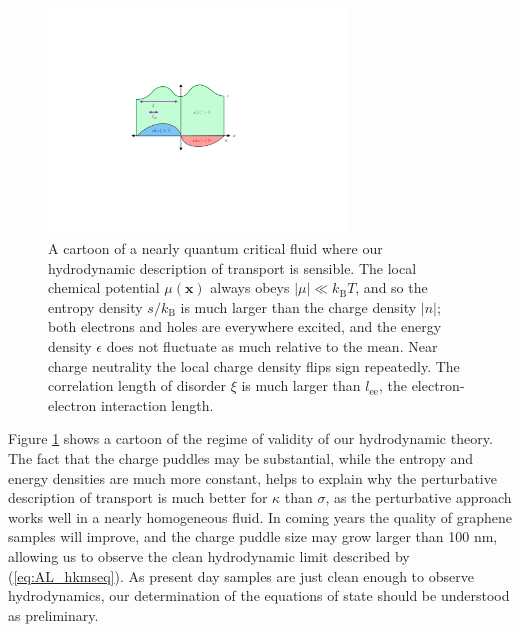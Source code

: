 \begin{figure}[t]
\centering
\includegraphics[width=80mm]{figures/hydro_theory/hydrofig.pdf}
\caption{A cartoon of a nearly quantum critical fluid where our hydrodynamic description of transport is sensible.   The local chemical potential $\mu(\mathbf{x})$ always obeys $|\mu| \ll k_{\mathrm{B}}T$,  and so the entropy density $s/k_{\mathrm{B}}$ is much larger than the charge density $|n|$;  both electrons and holes are everywhere excited, and the energy density $\epsilon$ does not fluctuate as much relative to the mean.  Near charge neutrality the local charge density flips sign repeatedly.   The correlation length of disorder $\xi$ is much larger than $l_{\mathrm{ee}}$, the electron-electron interaction length.}
\label{fig:AL_hydrofig}
\end{figure}

Figure \ref{fig:AL_hydrofig} shows a cartoon of the regime of validity of our hydrodynamic theory.   The fact that the charge puddles may be substantial, while the entropy and energy densities are much more constant,  helps to explain why the perturbative description of transport is much better for $\kappa$ than $\sigma$,  as the perturbative approach works well in a nearly homogeneous fluid.  In coming years the quality of graphene samples will improve, and the charge puddle size may grow larger than 100 nm, allowing us to observe the clean hydrodynamic limit described by (\ref{eq:AL_hkmseq}).   As present day samples are just clean enough to observe hydrodynamics, our determination of the equations of state should be understood as preliminary.

